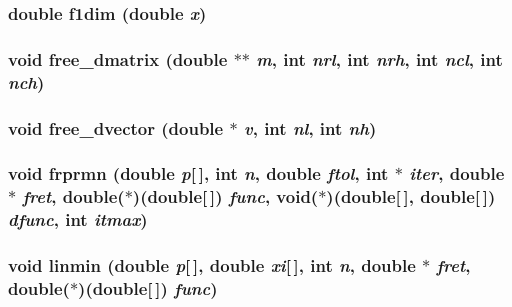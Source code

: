 \subsubsection{\setlength{\rightskip}{0pt plus 5cm}double f1dim (double {\em x})}\label{nrminmd_8c_1f33ec0c582389ac212cdd33637c4291}


\subsubsection{\setlength{\rightskip}{0pt plus 5cm}void free\_\-dmatrix (double $\ast$$\ast$ {\em m}, int {\em nrl}, int {\em nrh}, int {\em ncl}, int {\em nch})}\label{nrminmd_8c_daec44c9a213f1abf0024b8dd18a1dc2}


\subsubsection{\setlength{\rightskip}{0pt plus 5cm}void free\_\-dvector (double $\ast$ {\em v}, int {\em nl}, int {\em nh})}\label{nrminmd_8c_de97c412868dfcf63ffa3db5ce03ec70}


\subsubsection{\setlength{\rightskip}{0pt plus 5cm}void frprmn (double {\em p}[$\,$], int {\em n}, double {\em ftol}, int $\ast$ {\em iter}, double $\ast$ {\em fret}, double($\ast$)(double[$\,$]) {\em func}, void($\ast$)(double[$\,$], double[$\,$]) {\em dfunc}, int {\em itmax})}\label{nrminmd_8c_f8fff74ef81fc8a2f4b1b2aaf9681de6}


\subsubsection{\setlength{\rightskip}{0pt plus 5cm}void linmin (double {\em p}[$\,$], double {\em xi}[$\,$], int {\em n}, double $\ast$ {\em fret}, double($\ast$)(double[$\,$]) {\em func})}\label{nrminmd_8c_fa23520c3f1daeead3c49076a30bb3a9}


